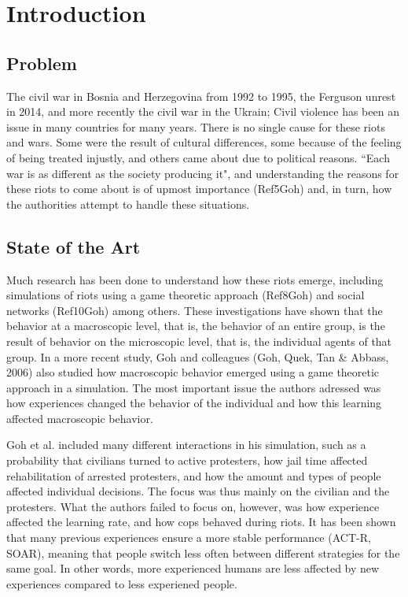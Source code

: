 \section{Introduction}
\subsection{Problem}
The civil war in Bosnia and Herzegovina from 1992 to 1995, the Ferguson unrest in 2014, and more recently the civil war in the Ukrain; Civil violence has been an issue in many countries for many years. There is no single cause for these riots and wars. Some were the result of cultural differences, some because of the feeling of being treated injustly, and others came about due to political reasons. ``Each war is as different as the society producing it", and understanding the reasons for these riots to come about is of upmost importance (Ref5Goh) and, in turn, how the authorities attempt to handle these situations. 

\subsection{State of the Art}
Much research has been done to understand how these riots emerge, including simulations of riots using a game theoretic approach (Ref8Goh) and social networks (Ref10Goh) among others. These investigations have shown that the behavior at a macroscopic level, that is, the behavior of an entire group, is the result of behavior on the microscopic level, that is, the individual agents of that group. In a more recent study, Goh and colleagues (Goh, Quek, Tan \& Abbass, 2006) also studied how macroscopic behavior emerged using a game theoretic approach in a simulation. The most important issue the authors adressed was how experiences changed the behavior of the individual and how this learning affected macroscopic behavior. 

Goh et al. included many different interactions in his simulation, such as a probability that civilians turned to active protesters, how jail time affected rehabilitation of arrested protesters, and how the amount and types of people affected individual decisions. The focus was thus mainly on the civilian and the protesters. What the authors failed to focus on, however, was how experience affected the learning rate, and how cops behaved during riots. It has been shown that many previous experiences ensure a more stable performance (ACT-R, SOAR), meaning that people switch less often between different strategies for the same goal. In other words, more experienced humans are less affected by new experiences compared to less experiened people.

